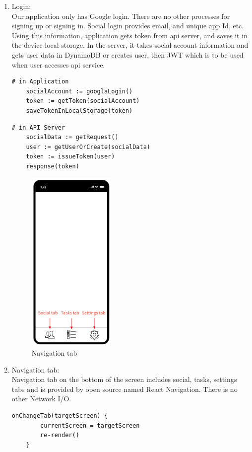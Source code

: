 \documentclass[conference]{IEEEtran}
\begin{document}
\begin{enumerate}
    \item Login: \\
    Our application only has Google login. There are no other processes for signing up or signing in. Social login provides email, and unique app Id, etc. Using this information, application gets token from api server, and saves it in the device local storage. In the server, it takes social account information and gets user data in DynamoDB or creates user, then JWT which is to be used when user accesses api service.
    \begin{lstlisting}[frame=single]
    # in Application
    socialAccount := googlaLogin()
    token := getToken(socialAccount)
    saveTokenInLocalStorage(token)
    \end{lstlisting}
    
    \begin{lstlisting}[frame=single]
    # in API Server
    socialData := getRequest()
    user := getUserOrCreate(socialData)
    token := issueToken(user)
    response(token)
    \end{lstlisting}
 
\begin{figure}[htp] \centering \includegraphics[width=120pt]{2) Navigation bar.PNG} \caption{Navigation tab} \label{fig:Navigation tab} \end{figure}
   
    \item Navigation tab: \\ 
    Navigation tab on the bottom of the screen includes social, tasks, settings tabs and is provided by open source named React Navigation. There is no other Network I/O.
    \begin{lstlisting}[frame=single]
    onChangeTab(targetScreen) {
        currentScreen = targetScreen
        re-render()
    }
    \end{lstlisting}
    

\end{enumerate}
\end{document}
